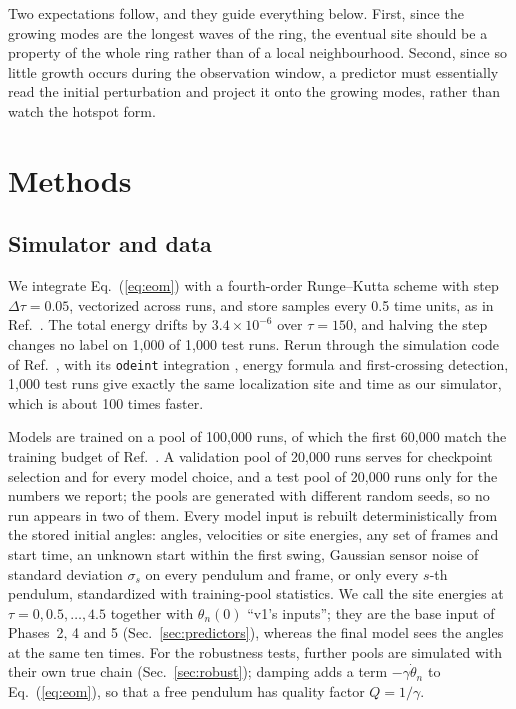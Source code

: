 \documentclass[11pt]{article}
\begin{document}
Two expectations follow, and they guide everything below. First, since the growing modes are the longest waves of the ring, the eventual site should be a property of the whole ring rather than of a local neighbourhood. Second, since so little growth occurs during the observation window, a predictor must essentially read the initial perturbation and project it onto the growing modes, rather than watch the hotspot form.

\section{Methods}
\label{sec:methods}

\subsection{Simulator and data}
\label{sec:pools}

We integrate Eq.~(\ref{eq:eom}) with a fourth-order Runge--Kutta scheme \cite{press1992numerical} with step $\Delta\tau=0.05$, vectorized across runs, and store samples every 0.5 time units, as in Ref.~\cite{mittal2026jand}. The total energy drifts by $3.4\times10^{-6}$ over $\tau=150$, and halving the step changes no label on 1,000 of 1,000 test runs. Rerun through the simulation code of Ref.~\cite{mittal2026jand}, with its \texttt{odeint} integration \cite{virtanen2020scipy}, energy formula and first-crossing detection, 1,000 test runs give exactly the same localization site and time as our simulator, which is about 100 times faster.

Models are trained on a pool of 100,000 runs, of which the first 60,000 match the training budget of Ref.~\cite{mittal2026jand}. A validation pool of 20,000 runs serves for checkpoint selection and for every model choice, and a test pool of 20,000 runs only for the numbers we report; the pools are generated with different random seeds, so no run appears in two of them. Every model input is rebuilt deterministically from the stored initial angles: angles, velocities or site energies, any set of frames and start time, an unknown start within the first swing, Gaussian sensor noise of standard deviation $\sigma_s$ on every pendulum and frame, or only every $s$-th pendulum, standardized with training-pool statistics. We call the site energies at $\tau=0,0.5,\dots,4.5$ together with $\theta_n(0)$ ``v1's inputs''; they are the base input of Phases~2, 4 and 5 (Sec.~\ref{sec:predictors}), whereas the final model sees the angles at the same ten times. For the robustness tests, further pools are simulated with their own true chain (Sec.~\ref{sec:robust}); damping adds a term $-\gamma\dot\theta_n$ to Eq.~(\ref{eq:eom}), so that a free pendulum has quality factor $Q=1/\gamma$.
\end{document}
